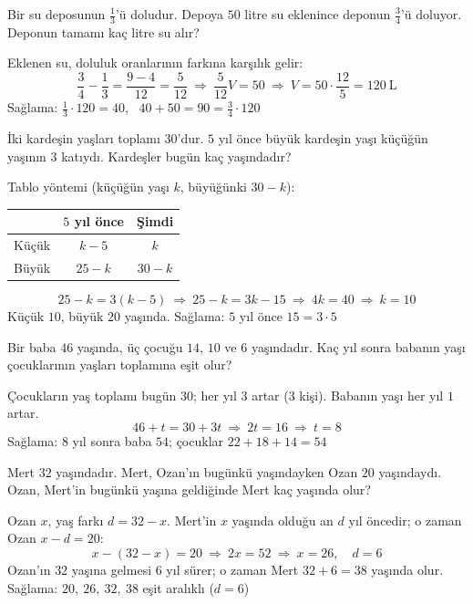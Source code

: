 \begin{alistirma}
Bir su deposunun \(\frac{1}{3}\)'ü doludur. Depoya \(50\) litre su eklenince deponun \(\frac{3}{4}\)'ü doluyor. Deponun tamamı kaç litre su alır?
\end{alistirma}
\begin{cozum}
Eklenen su, doluluk oranlarının farkına karşılık gelir:
\[\frac{3}{4}-\frac{1}{3}=\frac{9-4}{12}=\frac{5}{12}\ \Rightarrow\ \frac{5}{12}V=50\ \Rightarrow\ V=50\cdot\frac{12}{5}=120\ \text{L}\]
Sağlama: \(\frac{1}{3}\cdot 120=40\), \ \(40+50=90=\frac{3}{4}\cdot 120\) \checkmark
\end{cozum}

\begin{alistirma}
İki kardeşin yaşları toplamı \(30\)'dur. \(5\) yıl önce büyük kardeşin yaşı küçüğün yaşının \(3\) katıydı. Kardeşler bugün kaç yaşındadır?
\end{alistirma}
\begin{cozum}
Tablo yöntemi (küçüğün yaşı \(k\), büyüğünki \(30-k\)):
\begin{center}
\begin{tabular}{lcc}
 & \(5\) yıl önce & Şimdi\\\hline
Küçük & \(k-5\) & \(k\)\\
Büyük & \(25-k\) & \(30-k\)
\end{tabular}
\end{center}
\[25-k=3(k-5)\ \Rightarrow\ 25-k=3k-15\ \Rightarrow\ 4k=40\ \Rightarrow\ k=10\]
Küçük \(10\), büyük \(20\) yaşında. \quad Sağlama: \(5\) yıl önce \(15=3\cdot 5\) \checkmark
\end{cozum}

\begin{alistirma}
Bir baba \(46\) yaşında, üç çocuğu \(14\), \(10\) ve \(6\) yaşındadır. Kaç yıl sonra babanın yaşı çocuklarının yaşları toplamına eşit olur?
\end{alistirma}
\begin{cozum}
Çocukların yaş toplamı bugün \(30\); her yıl \(3\) artar (\(3\) kişi). Babanın yaşı her yıl \(1\) artar.
\[46+t=30+3t\ \Rightarrow\ 2t=16\ \Rightarrow\ t=8\]
Sağlama: \(8\) yıl sonra baba \(54\); çocuklar \(22+18+14=54\) \checkmark
\end{cozum}

\begin{alistirma}
Mert \(32\) yaşındadır. Mert, Ozan'ın bugünkü yaşındayken Ozan \(20\) yaşındaydı. Ozan, Mert'in bugünkü yaşına geldiğinde Mert kaç yaşında olur?
\end{alistirma}
\begin{cozum}
Ozan \(x\), yaş farkı \(d=32-x\). Mert'in \(x\) yaşında olduğu an \(d\) yıl öncedir; o zaman Ozan \(x-d=20\):
\[x-(32-x)=20\ \Rightarrow\ 2x=52\ \Rightarrow\ x=26,\quad d=6\]
Ozan'ın \(32\) yaşına gelmesi \(6\) yıl sürer; o zaman Mert \(32+6=38\) yaşında olur.\\
Sağlama: \(20,\ 26,\ 32,\ 38\) eşit aralıklı (\(d=6\)) \checkmark
\end{cozum}

